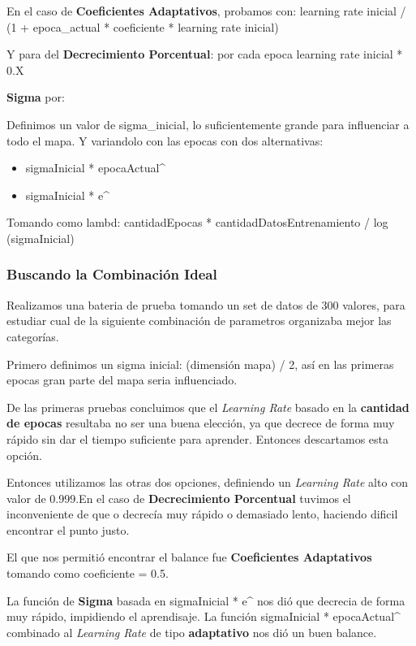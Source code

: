 En el caso de \textbf{Coeficientes Adaptativos}, probamos con:
learning rate inicial / (1 + epoca_actual * coeficiente * learning rate inicial)

Y para del \textbf{Decrecimiento Porcentual}: por cada epoca learning rate inicial * 0.X


\textbf{Sigma} por:

Definimos un valor de sigma_inicial, lo suficientemente grande para influenciar a todo 
el mapa. Y variandolo con las epocas con dos alternativas:

\begin{itemize}
	\item sigmaInicial * {epocaActual^}
	\item sigmaInicial * e^
\end{itemize}

Tomando como lambd: cantidadEpocas * cantidadDatosEntrenamiento / log (sigmaInicial)


\subsubsection{Buscando la Combinación Ideal}

Realizamos una bateria de prueba tomando un set de datos de 300 valores, para
estudiar cual de la siguiente combinación de parametros organizaba mejor
las categorías.

Primero definimos un sigma inicial: (dimensión mapa) / 2, así en las primeras
epocas gran parte del mapa seria influenciado.

De las primeras pruebas concluimos que el \emph{Learning Rate} basado en la 
\textbf{cantidad de epocas} resultaba no ser una buena elección, ya que
decrece de forma muy rápido sin dar el tiempo suficiente para aprender.
Entonces descartamos esta opción.

Entonces utilizamos las otras dos opciones, definiendo un \emph{Learning Rate}
alto con valor de 0.999.En el caso de \textbf{Decrecimiento Porcentual}
tuvimos el inconveniente de que o decrecía muy rápido o demasiado lento, haciendo
dificil encontrar el punto justo.

El que nos permitió encontrar el balance fue \textbf{Coeficientes Adaptativos}
tomando como coeficiente = 0.5.

La función de \textbf{Sigma} basada en sigmaInicial * e^
nos dió que decrecia de forma muy rápido, impidiendo el aprendisaje.
La función sigmaInicial * {epocaActual^} combinado al \emph{Learning Rate}
de tipo \textbf{adaptativo} nos dió un buen balance.

